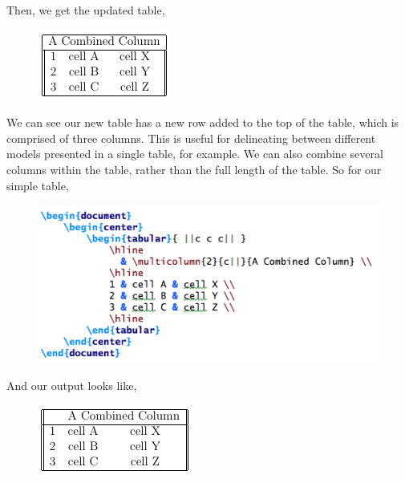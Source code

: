\documentclass[11pt]{article}
\begin{document}
Then, we get the updated table,

\begin{figure}[!h]
	\includegraphics[scale=.6]{OUT3} \\ %
	\centering
\end{figure}

We can see our new table has a new row added to the top of the table, which is comprised of three columns. This is useful for delineating between different models presented in a single table, for example. We can also combine several columns within the table, rather than the full length of the table. So for our simple table, 

\begin{figure}[!h]
	\includegraphics[scale=.5]{CODE4} \\ %
\end{figure}

\newpage

And our output looks like,

\begin{figure}[!h]
	\includegraphics[scale=.6]{OUT4} \\ %
	\centering
\end{figure}
\end{document}
